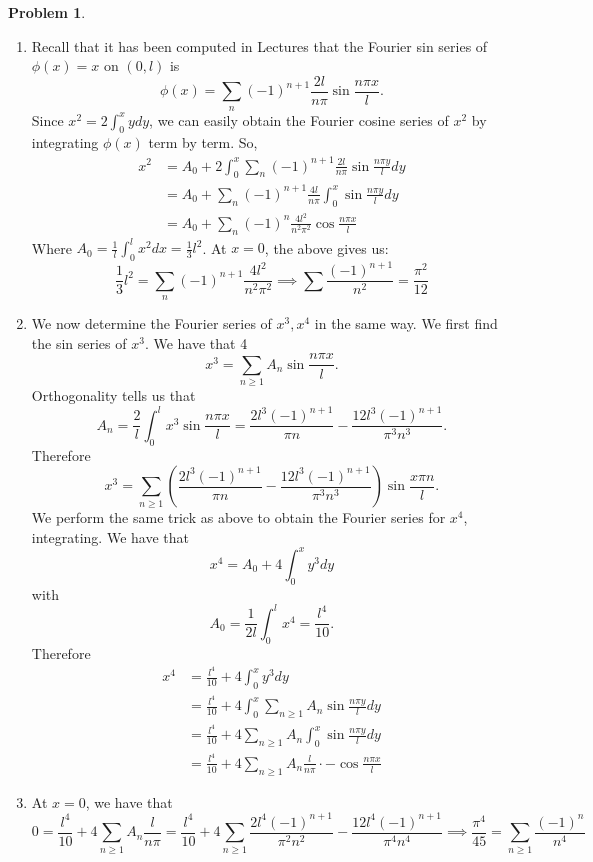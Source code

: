 \documentclass[12pt, a4paper]{article}
\newtheorem{problem}{Problem}
\theoremstyle{definition}
\newcommand{\penum}{ \begin{enumerate}[label=\bf(\alph*), leftmargin=0pt]}
\newcommand{\epenum}{ \end{enumerate} }
\begin{document}
 \newpage 
\begin{problem}
\end{problem}
\penum
\item Recall that it has been computed in Lectures that the Fourier sin series of $\phi(x) = x$ on $(0,l)$ is
$$\phi(x) = \sum_n (-1)^{n+1}\frac{ 2l}{n\pi} \sin \frac{n\pi x}{l}.$$
Since $x^2 = 2 \int_0^x y dy$, we can easily obtain the Fourier cosine series of $x^2$ by integrating $\phi(x)$ term by term.
So, 
\begin{align*}
x^2 &= A_0+ 2 \int_0^x\sum_n (-1)^{n+1}\frac{ 2l}{n\pi} \sin \frac{n\pi y}{l} dy 
\\ & = A_0 + \sum_n (-1)^{n+1} \frac{4l}{n\pi} \int_0^x \sin \frac{n\pi y}{l} dy 
\\ & =  A_0 +  \sum_n (-1)^{n} \frac{4l^2}{n^2\pi^2} \cos\frac{n\pi x}{l} 
\end{align*}
Where $A_0 = \frac{1}{l} \int_0^l x^2 dx  = \frac{1}{3}l^2$. At $x=0$, the above gives us:
$$\frac{1}{3}l^2 = \sum_n (-1)^{n+1}\frac{4l^2}{n^2\pi^2} \implies \sum \frac{(-1)^{n+1}}{n^2} =\frac{\pi^2}{12} $$
\item We now determine the Fourier series of $x^3,x^4$ in the same way. We first find the sin series of $x^3$. We have that 4
$$x^3 = \sum_{n\geq 1} A_n \sin \frac{n\pi x}{l}.$$
Orthogonality tells us that 
$$A_n = \frac{2}{l} \int_0^l  x^3 \sin\frac{n\pi x}{l} = \frac{2l^3 (-1)^{n+1}}{\pi n} - \frac{12l^3(-1)^{n+1}}{\pi^3 n^3}.$$
Therefore $$x^3 = \sum_{n\geq 1}\left(\frac{2l^3 (-1)^{n+1}}{\pi n} - \frac{12l^3(-1)^{n+1}}{\pi^3 n^3} \right) \sin \frac{x\pi n}{l}.$$
We perform the same trick as above to obtain the Fourier series for $x^4$, integrating. We have that $$x^4 = A_0+ 4\int_0^x y^3 dy$$ with $$A_0= \frac{1}{2l} \int_0^l x^4 =  \frac{l^4}{10}.$$
Therefore
\begin{align*}
	x^4 &= \frac{l^4}{10} + 4\int_0^x y^3 dy
	\\ & = \frac{l^4}{10} +4 \int_0^x \sum_{n\geq 1} A_n \sin \frac{n\pi y}{l} dy
	\\ & = \frac{l^4}{10} + 4\sum_{n\geq 1} A_n \int_{0}^x \sin \frac{n\pi y}{l} dy
	\\ & = \frac{l^4}{10} +4 \sum_{n\geq 1} A_n \frac{l}{n \pi} \cdot -\cos \frac{n\pi x}{l}
\end{align*}
\item At $x = 0$, we have that 
$$0 = \frac{l^4}{10} +4 \sum_{n\geq 1} A_n \frac{l}{n \pi} = \frac{l^4}{10} + 4\sum_{n \geq 1}\frac{2l^4 (-1)^{n+1}}{\pi^2 n^2} - \frac{12l^4(-1)^{n+1}}{\pi^4 n^4} \implies \frac{\pi^4}{45} = \sum_{n\geq 1}\frac{(-1)^n}{n^4}$$
\epenum
\end{document}
